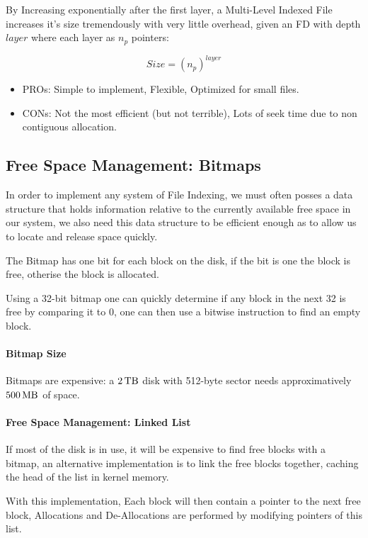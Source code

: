 \documentclass[openright, twoside]{report}
\theoremstyle{definition}
\theoremstyle{example}
\begin{document}
By Increasing exponentially after the first layer, a Multi-Level Indexed File increases it's 
size tremendously with very little overhead, given an FD with depth $layer$ where each layer as $n_p$ pointers:

\[
	Size = (n_{p})^{layer}	
\]

\begin{itemize}
	\item PROs: Simple to implement, Flexible, Optimized for small files.
	\item CONs: Not the most efficient (but not terrible), Lots of seek time due to non contiguous allocation.
\end{itemize}

\subsection{Free Space Management: Bitmaps}
In order to implement any system of File Indexing, we must often posses a data structure that 
holds information relative to the currently available free space in our system, we also 
need this data structure to be efficient enough as to allow us to locate and release space quickly.

The Bitmap has one bit for each block on the disk, 
if the bit is one the block is free, otherise the block is allocated.

Using a 32-bit bitmap one can quickly determine if any block in the next 32 is free by 
comparing it to 0, one can then use a bitwise instruction to find an empty block.

\paragraph{Bitmap Size}
Bitmaps are expensive: a $\SI{2}{\tera\byte}$ disk with 512-byte sector needs 
approximatively $\SI{500}{\mega\byte}$ of space.

\paragraph{Free Space Management: Linked List}
If most of the disk is in use, it will be expensive to find free blocks with a bitmap, an 
alternative implementation is to link the free blocks together, caching the head of the list 
in kernel memory.

With this implementation, Each block will then contain a pointer to the next free block, Allocations 
and De-Allocations are performed by modifying pointers of this list.
\end{document}
